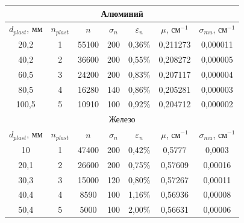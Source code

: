 \documentclass[a4paper, 12pt]{article}%
\begin{document}
\begin{table}[h]
\begin{center}
\begin{tabular}{|c|c|c|c|c|c|c|}
\hline
\multicolumn{7}{|c|}{Алюминий}                                                                                     \\ \hline
$d_{plast}$, мм & $n_{plast}$ & $n$   & $\sigma_n$ & $\varepsilon_n$ & $\mu$, см$^{-1}$ & $\sigma_{mu}$, см$^{-1}$ \\ \hline
20,2            & 1           & 55100 & 200        & 0,36\%          & 0,211273         & 0,000011                 \\ \hline
40,2            & 2           & 36600 & 200        & 0,55\%          & 0,208272         & 0,000005                 \\ \hline
60,5            & 3           & 24200 & 200        & 0,83\%          & 0,207117         & 0,000004                 \\ \hline
80,5            & 4           & 16280 & 140        & 0,86\%          & 0,205281         & 0,000003                 \\ \hline
100,5           & 5           & 10910 & 100        & 0,92\%          & 0,204712         & 0,000002                 \\ \hline
\multicolumn{7}{|c|}{Железо}                                                                                       \\ \hline
$d_{plast}$, мм & $n_{plast}$ & $n$   & $\sigma_n$ & $\varepsilon_n$ & $\mu$, см$^{-1}$ & $\sigma_{mu}$, см$^{-1}$ \\ \hline
10              & 1           & 47400 & 200        & 0,42\%          & 0,5777           & 0,0003                   \\ \hline
20,1            & 2           & 26600 & 200        & 0,75\%          & 0,57609          & 0,00016                  \\ \hline
30,3            & 3           & 15000 & 120        & 0,80\%          & 0,57267          & 0,00011                  \\ \hline
40,4            & 4           & 8590  & 100        & 1,16\%          & 0,56936          & 0,00008                  \\ \hline
50,4            & 5           & 5000  & 100        & 2,00\%          & 0,56631          & 0,00006                  \\ \hline
\end{tabular}
\end{center}
\end{table}
\end{document}
